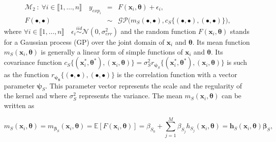 \documentclass[soumission]{jsfds}
\begin{document}
\begin{eqnarray}
\mathcal{M}_2 \ : \ \forall i \in \llbracket1,\dots,n\rrbracket \quad y_{exp_i} &=& F(\boldsymbol{x}_i,\boldsymbol{\theta}) + \epsilon_i,
\label{eq:M2}\\
F(\bullet,\bullet) & \sim &{\mathcal{GP}}{\Big(m_S(\bullet,\bullet),c_S\{(\bullet,\bullet),(\bullet,\bullet)\}\Big)},
\nonumber
\end{eqnarray}
where $\forall i \in \llbracket1,\dots,n\rrbracket \quad \epsilon_i\overset{iid}{\sim}\mathcal{N}(0,\sigma_{err}^2)$ and the random function $F(\boldsymbol{x}_i,\boldsymbol{\theta})$ stands for a Gaussian process (GP) over the joint domain of $\boldsymbol{x}_i$ and $\boldsymbol{\theta}$. Its mean function $m_{S}(\boldsymbol{x}_i,\boldsymbol{\theta})$ is generally a linear form of simple functions of $\boldsymbol{x}_i$ and $\boldsymbol{\theta}$. Its covariance function $c_S\{(\boldsymbol{x}_i^*,\boldsymbol{\theta}^*),(\boldsymbol{x}_i,\boldsymbol{\theta})\}=\sigma_S^2 r_{\boldsymbol{\psi}_S}\{(\boldsymbol{x}_i^*,\boldsymbol{\theta}^*),(\boldsymbol{x}_i,\boldsymbol{\theta})\}$ is such as the function $r_{\boldsymbol{\psi_S}}\{(\bullet,\bullet),(\bullet,\bullet)\}$ is the correlation function with a vector parameter $\boldsymbol{\psi}_S$. This parameter vector represents the scale and the regularity of the kernel and where $\sigma_S^2$ represents the variance. The mean $m_{S}(\boldsymbol{x}_i,\boldsymbol{\theta})$ can be written as\newline




\begin{equation}
m_S(\boldsymbol{x}_i,\boldsymbol{\theta})=m_{\boldsymbol{\beta}_S}(\boldsymbol{x}_i,\boldsymbol{\theta})=\mathbb{E}[F(\boldsymbol{x}_i,\boldsymbol{\theta})]=\beta_{S_0}+\sum_{j=1}^{M}\beta_{S_j}h_{S_j}(\boldsymbol{x}_i,\boldsymbol{\theta})=\boldsymbol{h}_S(\boldsymbol{x}_i,\boldsymbol{\theta})\boldsymbol{\beta}_S,
\label{eq:MeanLin}
\end{equation}
\end{document}
